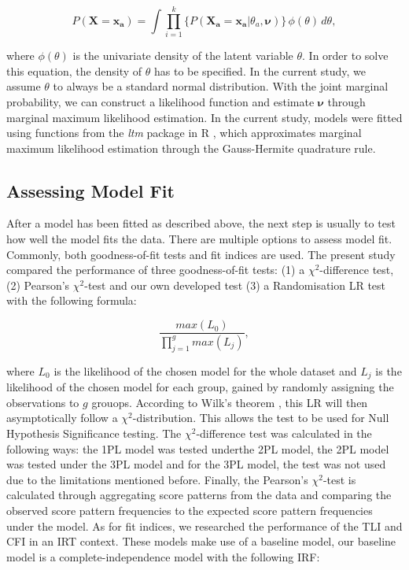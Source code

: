 \documentclass[Royal,sageapa,times,doublespace]{sagej}
\begin{document}
\begin{equation}
P(\boldsymbol{X} = \boldsymbol{x_a}) = \int \prod_{i=1}^{k} \{ P(\boldsymbol{X_a} = \boldsymbol{x_a} | \theta_a, \boldsymbol{\nu}) \} \,\phi(\theta)\,d\theta,
\end{equation}

where $\phi(\theta)$ is the univariate density of the latent variable $\theta$. In order to solve this equation, the density of $\theta$ has to be specified. In the current study, we assume $\theta$ to always be a standard normal distribution. With the joint marginal probability, we can construct a likelihood function and estimate $\boldsymbol{\nu}$ through marginal maximum likelihood estimation. In the current study, models were fitted using functions from the \textit{ltm} package in R \cite{ltmpack}, which approximates marginal maximum likelihood estimation through the Gauss-Hermite quadrature rule.

\subsection{Assessing Model Fit}
\indent After a model has been fitted as described above, the next step is usually to test how well the model fits the data. There are multiple options to assess model fit. Commonly, both goodness-of-fit tests and fit indices are used. The present study compared the performance of three goodness-of-fit tests: (1) a $\chi^2$-difference test, (2) Pearson's $\chi^2$-test and our own developed test (3) a Randomisation LR test with the following formula:

\begin{equation}
\frac{max(L_0)}{\prod_{j = 1}^g max(L_j)},
\end{equation}

where $L_0$ is the likelihood of the chosen model for the whole dataset and $L_j$ is the likelihood of the chosen model for each group, gained by randomly assigning the observations to $g$ grouops. According to Wilk's theorem \cite{wilkth}, this LR will then asymptotically follow a $\chi^2$-distribution. This allows the test to be used for Null Hypothesis Significance testing. The $\chi^2$-difference test was calculated in the following ways: the 1PL model was tested underthe 2PL model, the 2PL model was tested under the 3PL model and for the 3PL model, the test was not used due to the limitations mentioned before. Finally, the Pearson's $\chi^2$-test is calculated through aggregating score patterns from the data and comparing the observed score pattern frequencies to the expected score pattern frequencies under the model. As for fit indices, we researched the performance of the TLI and CFI in an IRT context. These models make use of a baseline model, our baseline model is a complete-independence model with the following IRF:
\end{document}
